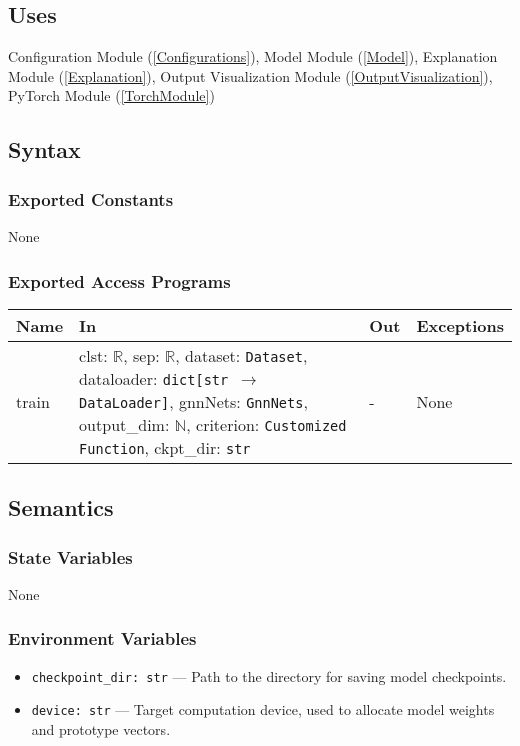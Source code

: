 \documentclass[12pt, titlepage]{article}
\begin{document}
\subsection{Uses}
Configuration Module (\ref{Configurations}), Model Module (\ref{Model}), Explanation Module (\ref{Explanation}), Output Visualization Module (\ref{OutputVisualization}), PyTorch Module (\ref{TorchModule})

\subsection{Syntax}

\subsubsection{Exported Constants}
None

\subsubsection{Exported Access Programs}
\begin{center}
\begin{tabular}{p{2.5cm} p{6.2cm} p{4cm} p{3cm}}
\hline
\textbf{Name} & \textbf{In} & \textbf{Out} & \textbf{Exceptions} \\
\hline
train & clst: \(\mathbb{R}\), sep: \(\mathbb{R}\), dataset: \texttt{Dataset}, dataloader: \texttt{dict[str $\rightarrow$ DataLoader]}, gnnNets: \texttt{GnnNets}, output\_dim: \(\mathbb{N}\), criterion: \texttt{Customized Function}, ckpt\_dir: \texttt{str} & - & None \\
\hline
\end{tabular}
\end{center}

\subsection{Semantics}

\subsubsection{State Variables}
None

\subsubsection{Environment Variables}
\begin{itemize}
  \item \texttt{checkpoint\_dir: str} — Path to the directory for saving model checkpoints.
  \item \texttt{device: str} — Target computation device, used to allocate model weights and prototype vectors.
\end{itemize}
\end{document}
